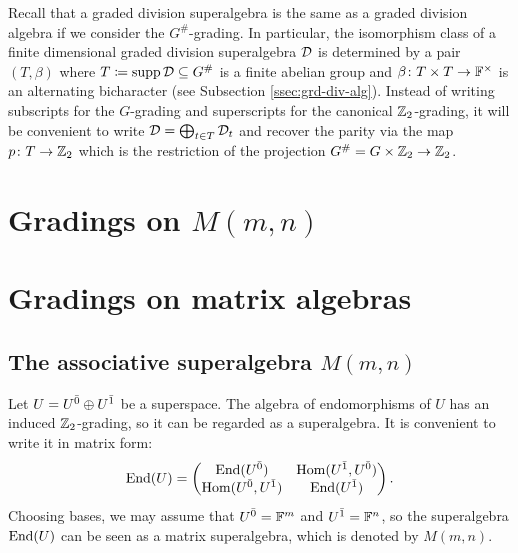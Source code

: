 Recall that a graded division superalgebra is the same as a graded division algebra if we consider the $G^\#$-grading.
In particular, the isomorphism class of a finite dimensional graded division superalgebra $\mathcal{D}$ is determined by a pair $(T, \beta)$ where $T \coloneqq \operatorname{supp} \mathcal{D} \subseteq G^\#$ is a finite abelian group and $\beta\colon T\times T \to \mathbb{F}^\times$ is an alternating bicharacter (see Subsection \ref{ssec:grd-div-alg}).
Instead of writing subscripts for the $G$-grading and superscripts for the canonical $\mathbb{Z}_2$-grading, it will be convenient to write $\mathcal{D} = \bigoplus_{t\in T} \mathcal{D}_t$ and recover the parity via the map $p\colon T \to \mathbb{Z}_2$ which is the restriction of the projection $G^\# = G\times \mathbb{Z}_2 \to \mathbb{Z}_2$.

\section{Gradings on $M(m,n)$}\label{sec:Mmn}

\section{Gradings on matrix algebras}
\label{sec:gradings-on-matrix-algebras}

\subsection{The associative superalgebra $M(m,n)$}\label{M(m,n)}
Let $U = U^{\bar0} \oplus U^{\bar1}$ be a superspace.
The algebra of endomorphisms of $U$ has an induced $\mathbb{Z}_{2}$-grading, so it can be regarded as a superalgebra. It is convenient to write it in matrix form:
%
\begin{equation}\label{eq:End_U}
	\operatorname{End}(U) = \left(\begin{matrix}
			\operatorname{End}(U^{\bar0})       & \operatorname{Hom}(U^{\bar1},U^{\bar0}) \\
			\operatorname{Hom}(U^{\bar0},U^{\bar1}) & \operatorname{End}(U^{\bar1})        \\
		\end{matrix}
	\right).
\end{equation}
%
Choosing bases, we may assume that $U^{\bar0}=\mathbb{F}^m$ and $U^{\bar1}=\mathbb{F}^n$, so the superalgebra $\operatorname{End}(U)$ can be seen as a matrix superalgebra, which is denoted by $M(m,n)$.

